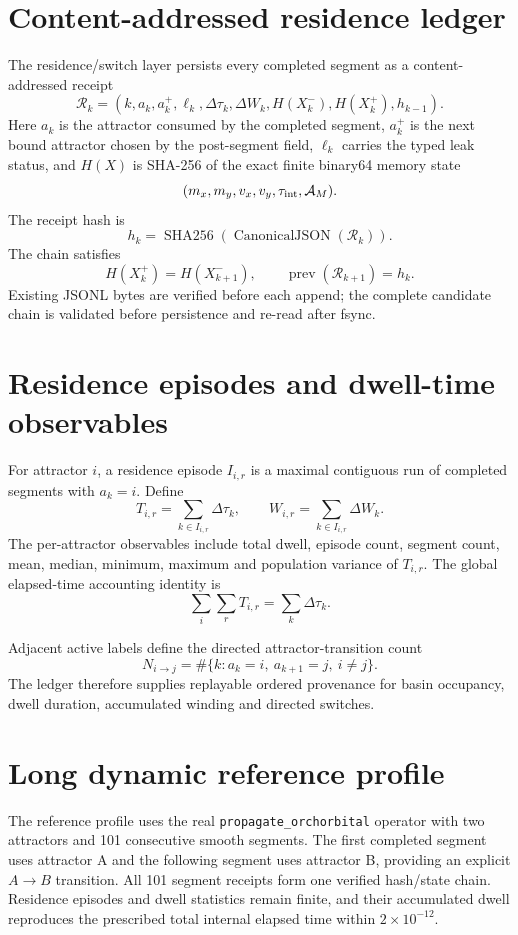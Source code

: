 \section{Content-addressed residence ledger}

The residence/switch layer persists every completed segment as a content-addressed receipt
\[
\boxed{
\mathcal R_k=
\left(
 k,a_k,a_k^+,\ell_k,
 \Delta\tau_k,\Delta W_k,
 H(X_k^-),H(X_k^+),h_{k-1}
\right).
}
\]
Here \(a_k\) is the attractor consumed by the completed segment, \(a_k^+\) is the next bound attractor chosen by the post-segment field, \(\ell_k\) carries the typed leak status, and \(H(X)\) is SHA-256 of the exact finite binary64 memory state
\[
(m_x,m_y,v_x,v_y,\tau_{\rm int},\mathcal A_M).
\]
The receipt hash is
\[
\boxed{
h_k=\operatorname{SHA256}\!\left(\operatorname{CanonicalJSON}(\mathcal R_k)\right).
}
\]
The chain satisfies
\[
\boxed{H(X_k^+)=H(X_{k+1}^-)},
\qquad
\boxed{\operatorname{prev}(\mathcal R_{k+1})=h_k.}
\]
Existing JSONL bytes are verified before each append; the complete candidate chain is validated before persistence and re-read after fsync.

\section{Residence episodes and dwell-time observables}

For attractor \(i\), a residence episode \(I_{i,r}\) is a maximal contiguous run of completed segments with \(a_k=i\). Define
\[
\boxed{
T_{i,r}=\sum_{k\in I_{i,r}}\Delta\tau_k,
}
\qquad
\boxed{
W_{i,r}=\sum_{k\in I_{i,r}}\Delta W_k.
}
\]
The per-attractor observables include total dwell, episode count, segment count, mean, median, minimum, maximum and population variance of \(T_{i,r}\). The global elapsed-time accounting identity is
\[
\boxed{
\sum_i\sum_rT_{i,r}=\sum_k\Delta\tau_k.
}
\]

Adjacent active labels define the directed attractor-transition count
\[
\boxed{
N_{i\to j}
=\#\{k:a_k=i,\ a_{k+1}=j,\ i\neq j\}.
}
\]
The ledger therefore supplies replayable ordered provenance for basin occupancy, dwell duration, accumulated winding and directed switches.

\section{Long dynamic reference profile}

The reference profile uses the real \texttt{propagate\_orchorbital} operator with two attractors and 101 consecutive smooth segments. The first completed segment uses attractor A and the following segment uses attractor B, providing an explicit \(A\to B\) transition. All 101 segment receipts form one verified hash/state chain. Residence episodes and dwell statistics remain finite, and their accumulated dwell reproduces the prescribed total internal elapsed time within \(2\times10^{-12}\).

